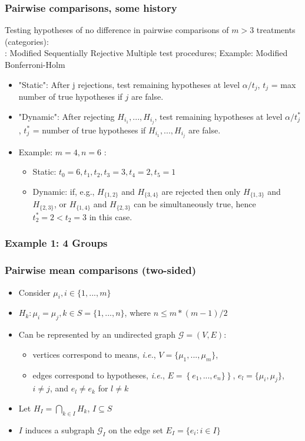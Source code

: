 \documentclass[bigger]{beamer}
\begin{document}
\begin{frame}
\frametitle{Pairwise comparisons, some history}

Testing hypotheses of no difference in pairwise comparisons of $m>3$ treatments (categories):\\
\cite{shaffer1986modified}: Modified Sequentially Rejective Multiple test procedures; Example: Modified Bonferroni-Holm
\begin{itemize}
  \item "Static":  After j rejections, test remaining hypotheses at level $\alpha/t_j$, $t_j$ = max number of true hypotheses if $j$ are false.
  \item "Dynamic": After rejecting $H_{i_1},...,H_{i_j}$, test remaining hypotheses at level $\alpha/t^*_j$,  $t^*_j$ = number of true hypotheses if $H_{i_1},...,H_{i_j}$ are false.
  \item Example: $m=4, n=6$ :
    \begin{itemize}
      \item Static: $t_0=6, t_1,t_2,t_3 = 3, t_4=2, t_5=1$
      \item Dynamic: if, e.g., $H_{\{1,2\}}$ and $H_{\{3,4\}}$ are rejected then only $H_{\{1,3\}}$ and $H_{\{2,3\}}$, or $H_{\{1,4\}}$ and $H_{\{2,3\}}$ can be simultaneously true, hence $t^*_2 = 2 < t_2 =3$ in this case.
       \end{itemize}
\end{itemize}
\end{frame}


\begin{frame}
\frametitle{Example 1: 4 Groups}

\end{frame}


\begin{frame}
\frametitle{Pairwise mean comparisons (two-sided)}
\begin{itemize}

\item Consider $\mu_i, i \in \{1,...,m\}$

\item $H_k: \mu_i = \mu_j, k \in S = \{1,...,n\}$, where $n \leq m*(m-1)/2$

\item Can be represented by an undirected graph $\mathscr{G} = (V,E)$:
\begin{itemize}
\item vertices correspond to means, \emph{i.e.}, $V = \{\mu_1,...,\mu_m\}$,
\item edges correspond to hypotheses, \emph{i.e.}, $E =
      \left\{e_1,...,e_n\} \right\}$, $e_l = \{\mu_i,\mu_j\}$, $i \neq
      j$, and $e_l \neq e_k$ for $l \neq k$
\end{itemize}
\item Let $H_I = \bigcap_{k \in I} H_k$, $I \subseteq S$
\item $I$ induces a subgraph $\mathscr{G}_I$ on the edge set $E_I=\{e_i: i
  \in I\}$
\end{itemize} %
\end{frame}
\end{document}
